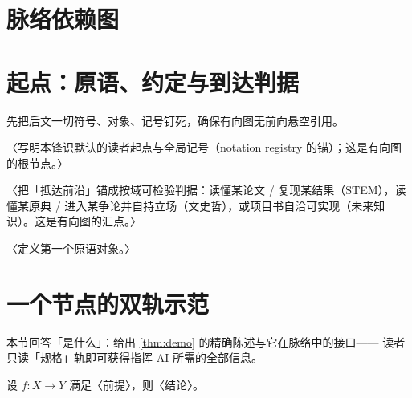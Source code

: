 \documentclass{keensight}
\begin{document}
\makecover
\tableofcontents

\chapter*{脉络依赖图}
\begin{center}
\end{center}

\chapter{起点：原语、约定与到达判据}

先把后文一切符号、对象、记号钉死，确保有向图无前向悬空引用。

\begin{convention}\label{conv:base}
〈写明本锋识默认的读者起点与全局记号（notation registry 的锚）；这是有向图的根节点。〉
\end{convention}

\begin{convention}[到达判据]\label{conv:goal}
〈把「抵达前沿」锚成按域可检验判据：读懂某论文 / 复现某结果（STEM），读懂某原典 / 进入某争论并自持立场（文史哲），或项目书自洽可实现（未来知识）。这是有向图的汇点。〉
\end{convention}

\begin{definition}\label{def:object}
〈定义第一个原语对象。〉
\end{definition}

\chapter{一个节点的双轨示范}

\begin{spec}
本节回答「是什么」：给出 \cref{thm:demo} 的精确陈述与它在脉络中的接口——
读者只读「规格」轨即可获得指挥 AI 所需的全部信息。

\begin{theorem}\label{thm:demo}
设 $f\colon X \to Y$ 满足〈前提〉，则〈结论〉。
\end{theorem}
\end{spec}
\end{document}

